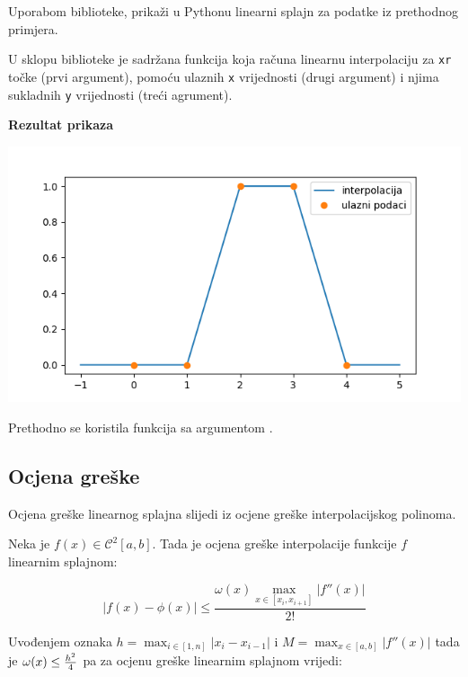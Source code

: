 \begin{example}
    Uporabom  biblioteke, prikaži u Pythonu linearni splajn
    za podatke iz prethodnog primjera.
\end{example}

U sklopu  biblioteke je sadržana  funkcija koja
računa linearnu interpolaciju za \verb|xr| točke (prvi argument), pomoću ulaznih
\verb|x| vrijednosti (drugi argument) i njima sukladnih \verb|y| vrijednosti
(treći agrument).

\begin{multicols}{2}
    

    \columnbreak

    \textbf{Rezultat prikaza}

    \includegraphics[width=\linewidth]{fig/lin_splajn.png}
\end{multicols}

Prethodno se koristila  funkcija sa argumentom .

\newpage

\subsection{Ocjena greške}

Ocjena greške linearnog splajna slijedi iz ocjene greške interpolacijskog polinoma.

Neka je $f(x)\in\mathcal{C}^2[a,b]$. Tada je ocjena greške interpolacije funkcije $f$ linearnim splajnom:

$$
|f(x)-\phi(x)| \leq \frac{\omega(x)\max_{x\in[x_i,x_{i+1}]}|f''(x)|}{2!}
$$

Uvođenjem oznaka $h=\max_{i\in[1,n]}|x_i-x_{i-1}|$ i $M=\max_{x\in[a,b]}|f''(x)|$ tada je $\omega(x)\leq{h^2\over4}$ pa za ocjenu greške linearnim splajnom vrijedi:

